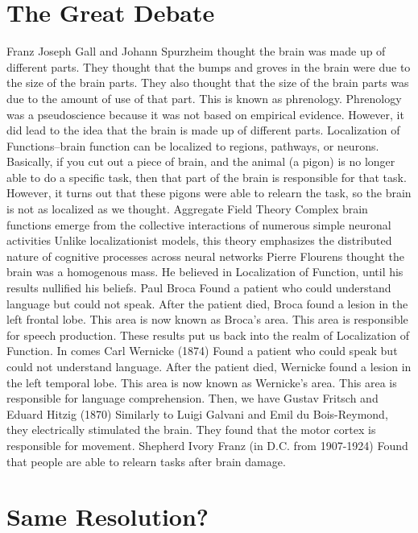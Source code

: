 \section{The Great Debate}

Franz Joseph Gall and Johann Spurzheim thought the brain was made up of different parts.
    They thought that the bumps and groves in the brain were due to the size of the brain parts.
    They also thought that the size of the brain parts was due to the amount of use of that part.
    This is known as phrenology.
    Phrenology was a pseudoscience because it was not based on empirical evidence.
    However, it did lead to the idea that the brain is made up of different parts.
Localization of Functions--brain function can be localized to regions, pathways, or neurons.
    Basically, if you cut out a piece of brain, and the animal (a pigon) is no longer able to do a specific task, then that part of the brain is responsible for that task. 
    However, it turns out that these pigons were able to relearn the task, so the brain is not as localized as we thought.
Aggregate Field Theory
    Complex brain functions emerge from the collective interactions of numerous simple neuronal activities
    Unlike localizationist models, this theory emphasizes the distributed nature of cognitive processes across neural networks
Pierre Flourens thought the brain was a homogenous mass.
    He believed in Localization of Function, until his results nullified his beliefs.
Paul Broca
    Found a patient who could understand language but could not speak.
    After the patient died, Broca found a lesion in the left frontal lobe.
    This area is now known as Broca's area.
    This area is responsible for speech production.
    These results put us back into the realm of Localization of Function.
In comes Carl Wernicke (1874)
    Found a patient who could speak but could not understand language.
    After the patient died, Wernicke found a lesion in the left temporal lobe.
    This area is now known as Wernicke's area.
    This area is responsible for language comprehension.
Then, we have Gustav Fritsch and Eduard Hitzig (1870)
    Similarly to Luigi Galvani and Emil du Bois-Reymond, they electrically stimulated the brain.
    They found that the motor cortex is responsible for movement.
Shepherd Ivory Franz (in D.C. from 1907-1924)
    Found that people are able to relearn tasks after brain damage.

\section{Same Resolution?}

